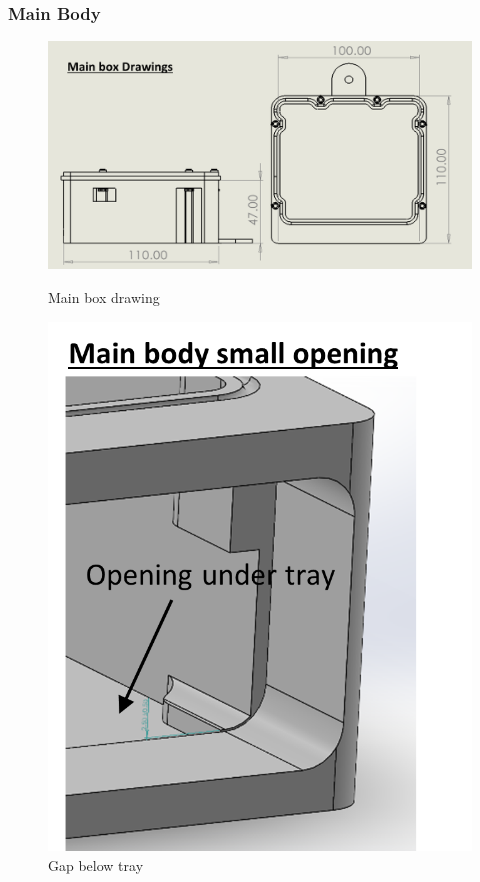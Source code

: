 \documentclass[9pt, technote, a4paper, nofonttune]{IEEEphot}
\begin{document}
        \subsubsection{Main Body}
        \begin{figure}[!tbp]
        \centering
        \begin{minipage}[b]{0.5\textwidth}
        \includegraphics[width=\textwidth]{D5/Main Box.png}
        \caption{Main box drawing}
        \end{minipage}
        \hfill
        \begin{minipage}[b]{0.23\textwidth}
        \includegraphics[width=\textwidth]{D5/MainBody_lowerfloor.png}
        \caption{Gap below tray}
        \end{minipage}
        \end{figure}
        
\end{document}

